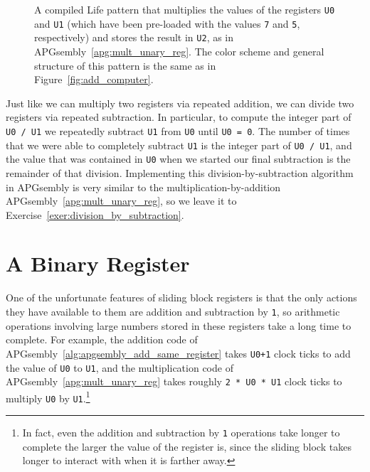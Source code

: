 \begin{figure}[!htb]
	\centering
	\caption{A compiled Life pattern that multiplies the values of the registers \texttt{U0} and \texttt{U1} (which have been pre-loaded with the values \texttt{7} and \texttt{5}, respectively) and stores the result in \texttt{U2}, as in APGsembly~\ref{apg:mult_unary_reg}. The color scheme and general structure of this pattern is the same as in Figure~\ref{fig:add_computer}.}\label{fig:mult_computer}
\end{figure}

Just like we can multiply two registers via repeated addition, we can divide two registers via repeated subtraction. In particular, to compute the integer part of \texttt{U0 / U1} we repeatedly subtract \texttt{U1} from \texttt{U0} until \texttt{U0 = 0}. The number of times that we were able to completely subtract \texttt{U1} is the integer part of \texttt{U0 / U1}, and the value that was contained in \texttt{U0} when we started our final subtraction is the remainder of that division. Implementing this division-by-subtraction algorithm in APGsembly is very similar to the multiplication-by-addition APGsembly~\ref{apg:mult_unary_reg}, so we leave it to Exercise~\ref{exer:division_by_subtraction}.


\section{A Binary Register}\label{sec:binary_register}

One of the unfortunate features of sliding block registers is that the only actions they have available to them are addition and subtraction by \texttt{1}, so arithmetic operations involving large numbers stored in these registers take a long time to complete. For example, the addition code of APGsembly~\ref{alg:apgsembly_add_same_register} takes \texttt{U0+1} clock ticks to add the value of \texttt{U0} to \texttt{U1}, and the multiplication code of APGsembly~\ref{apg:mult_unary_reg} takes roughly \texttt{2 * U0 * U1} clock ticks to multiply \texttt{U0} by \texttt{U1}.\footnote{In fact, even the addition and subtraction by \texttt{1} operations take longer to complete the larger the value of the register is, since the sliding block takes longer to interact with when it is farther away.}

